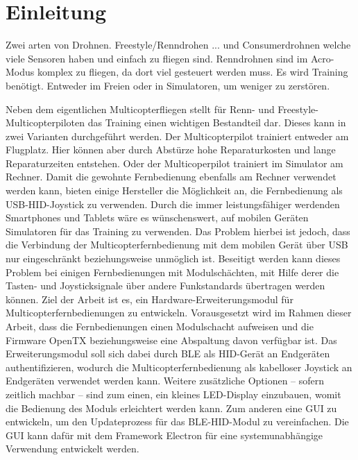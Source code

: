 
\chapter{Einleitung}



Zwei arten von Drohnen. Freestyle/Renndrohen ... und Consumerdrohnen welche viele Sensoren haben und einfach zu fliegen sind.
Renndrohnen sind im Acro-Modus komplex zu fliegen, da dort viel gesteuert werden muss.
Es wird Training benötigt. Entweder im Freien oder in Simulatoren, um weniger zu zerstören.

Neben dem eigentlichen Multicopterfliegen stellt für Renn- und Freestyle-Multicopterpiloten das Training einen wichtigen Bestandteil dar. Dieses kann in zwei Varianten durchgeführt werden. Der
Multicopterpilot trainiert entweder am Flugplatz. Hier können aber durch Abstürze hohe Reparaturkosten und lange Reparaturzeiten entstehen. Oder der Multicoperpilot trainiert im Simulator am Rechner.
Damit die gewohnte Fernbedienung ebenfalls am Rechner verwendet werden kann, bieten einige Hersteller die Möglichkeit an, die Fernbedienung als USB-HID-Joystick zu verwenden.
Durch die immer leistungsfähiger werdenden Smartphones und Tablets wäre es wünschenswert, auf mobilen Geräten Simulatoren für das Training zu verwenden. Das Problem hierbei ist jedoch, dass die
Verbindung der Multicopterfernbedienung mit dem mobilen Gerät über USB nur eingeschränkt beziehungsweise unmöglich ist. Beseitigt werden kann dieses Problem bei einigen Fernbedienungen mit
Modulschächten, mit Hilfe derer die Tasten- und Joysticksignale über andere Funkstandards übertragen werden können.
Ziel der Arbeit ist es, ein Hardware-Erweiterungsmodul für Multicopterfernbedienungen zu entwickeln. Vorausgesetzt wird im Rahmen dieser Arbeit, dass die Fernbedienungen einen Modulschacht aufweisen
und die Firmware OpenTX beziehungsweise eine Abspaltung davon verfügbar ist. Das Erweiterungsmodul soll sich dabei durch BLE als HID-Gerät an Endgeräten authentifizieren, wodurch die
Multicopterfernbedienung als kabelloser Joystick an Endgeräten verwendet werden kann.
Weitere zusätzliche Optionen -- sofern zeitlich machbar -- sind zum einen, ein kleines LED-Display einzubauen, womit die Bedienung des Moduls erleichtert werden kann. Zum anderen eine GUI zu entwickeln,
um den Updateprozess für das BLE-HID-Modul zu vereinfachen. Die GUI kann dafür mit dem Framework Electron für eine systemunabhängige Verwendung entwickelt werden.

